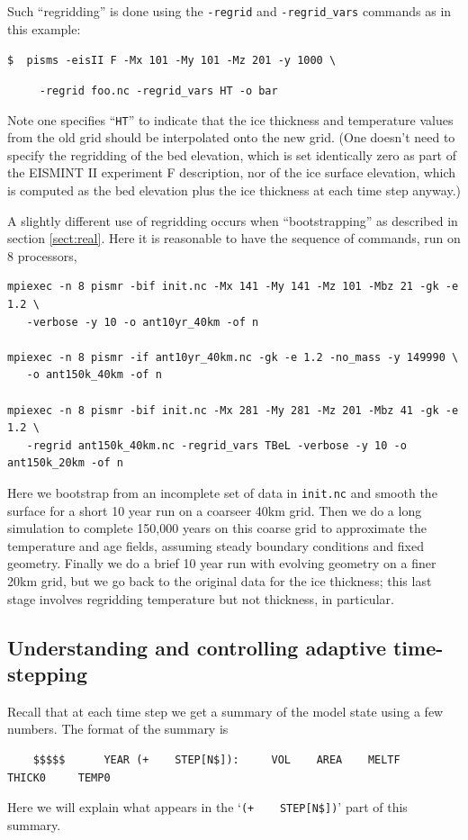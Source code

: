 \documentclass[11pt,final]{amsart}
\begin{document}
Such ``regridding'' is done using the \verb|-regrid| and \verb|-regrid_vars| commands as in this example:

\verb|$  pisms -eisII F -Mx 101 -My 101 -Mz 201 -y 1000 \|

\verb|     -regrid foo.nc -regrid_vars HT -o bar|

\noindent Note one specifies ``\verb|HT|'' to indicate that the ice thickness and temperature values from the old grid should be interpolated onto the new grid.  (One doesn't need to specify the regridding of the bed elevation, which is set identically zero as part of the EISMINT II experiment F description, nor of the ice surface elevation, which is computed as the bed elevation plus the ice thickness at each time step anyway.)

A slightly different use of regridding occurs when ``bootstrapping'' as described in section \ref{sect:real}.  Here it is reasonable to have the sequence of commands, run on 8 processors,
\small
\begin{verbatim}
mpiexec -n 8 pismr -bif init.nc -Mx 141 -My 141 -Mz 101 -Mbz 21 -gk -e 1.2 \
   -verbose -y 10 -o ant10yr_40km -of n

mpiexec -n 8 pismr -if ant10yr_40km.nc -gk -e 1.2 -no_mass -y 149990 \
   -o ant150k_40km -of n

mpiexec -n 8 pismr -bif init.nc -Mx 281 -My 281 -Mz 201 -Mbz 41 -gk -e 1.2 \
   -regrid ant150k_40km.nc -regrid_vars TBeL -verbose -y 10 -o ant150k_20km -of n
\end{verbatim}
\normalsize
Here we bootstrap from an incomplete set of data in \verb|init.nc| and smooth the surface for a short 10 year run on a coarseer 40km grid.  Then we do a long simulation to complete 150,000 years on this coarse grid to approximate the temperature and age fields, assuming steady boundary conditions and fixed geometry.  Finally we do a brief 10 year run with evolving geometry on a finer 20km grid, but we go back to the original data for the ice thickness; this last stage involves regridding temperature but not thickness, in particular.

\subsection{Understanding and controlling adaptive time-stepping}  Recall that at each time step we get a summary of the model state using a few numbers.  The format of the summary is
\begin{verbatim}
    $$$$$      YEAR (+    STEP[N$]):     VOL    AREA    MELTF     THICK0     TEMP0
\end{verbatim}
Here we will explain what appears in the `\verb|(+    STEP[N$])|' part of this summary.
\end{document}
